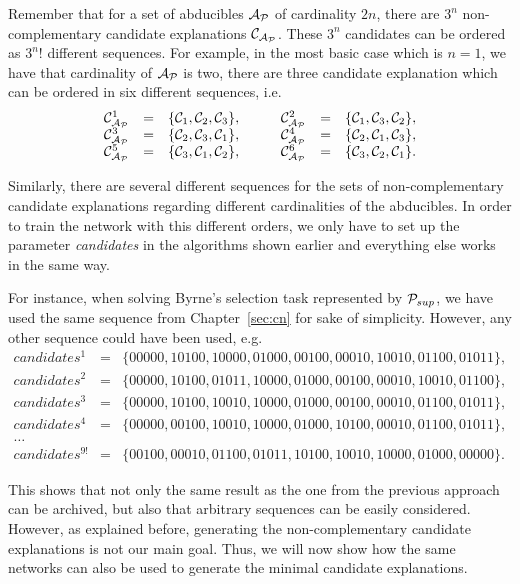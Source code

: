 Remember that for a set of abducibles $\mathcal{A}_{\mathcal{P}}$ of cardinality $2n$, there are $3^n$ non-complementary candidate explanations $\mathcal{C}_{\mathcal{A}_{\mathcal{P}}}$. These $3^n$ candidates can be ordered as $3^n!$ different sequences. For example, in the most basic case which is $n = 1$, we have that cardinality of $\mathcal{A}_{\mathcal{P}}$ is two, there are three candidate explanation which can be ordered in six different sequences, i.e.
\[
\begin{array}{lclclcl}
\mathcal{C}_{\mathcal{A}_{\mathcal{P}}}^1 &=& \{\mathcal{C}_1, \mathcal{C}_2, \mathcal{C}_3\}, &\quad& \mathcal{C}_{\mathcal{A}_{\mathcal{P}}}^2 &=& \{\mathcal{C}_1, \mathcal{C}_3, \mathcal{C}_2\},\\
\mathcal{C}_{\mathcal{A}_{\mathcal{P}}}^3 &=& \{\mathcal{C}_2, \mathcal{C}_3, \mathcal{C}_1\}, &\quad& \mathcal{C}_{\mathcal{A}_{\mathcal{P}}}^4 &=& \{\mathcal{C}_2, \mathcal{C}_1, \mathcal{C}_3\},\\
\mathcal{C}_{\mathcal{A}_{\mathcal{P}}}^5 &=& \{\mathcal{C}_3, \mathcal{C}_1, \mathcal{C}_2\}, &\quad& \mathcal{C}_{\mathcal{A}_{\mathcal{P}}}^6 &=& \{\mathcal{C}_3, \mathcal{C}_2, \mathcal{C}_1\}.
\end{array}
\]

Similarly, there are several different sequences for the sets of non-complementary candidate explanations regarding different cardinalities of the abducibles. In order to train the network with this different orders, we only have to set up the parameter \textit{candidates} in the algorithms shown earlier and everything else works in the same way.

For instance, when solving Byrne's selection task represented by $\mathcal{P}_{sup}$, we have used the same sequence from Chapter~\ref{sec:cn} for sake of simplicity. However, any other sequence could have been used, e.g.
\[
\begin{array}{lcl}
candidates^1 &=& \{00000, 10100, 10000, 01000, 00100, 00010, 10010, 01100, 01011\}, \\
candidates^2 &=& \{00000, 10100, 01011, 10000, 01000, 00100, 00010, 10010, 01100\}, \\
candidates^3 &=& \{00000, 10100, 10010, 10000, 01000, 00100, 00010, 01100, 01011\},  \\
candidates^4 &=& \{00000, 00100, 10010, 10000, 01000, 10100, 00010, 01100, 01011\},  \\
\dots\\
candidates^{9!} &=& \{00100, 00010, 01100, 01011, 10100, 10010, 10000, 01000, 00000\}. 
\end{array}
\]

This shows that not only the same result as the one from the previous approach can be archived, but also that arbitrary sequences can be easily considered. However, as explained before, generating the non-complementary candidate explanations is not our main goal. Thus, we will now show how the same networks can also be used to generate the minimal candidate explanations.


